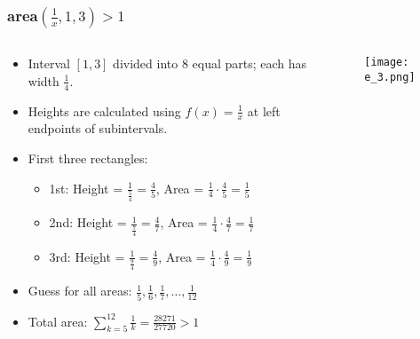 \begin{frame}
  \frametitle{area\((\frac{1}{x},1,3) > 1 \) }
  \begin{columns}
    \begin{column}{0.5\textwidth}
      \begin{itemize}
        \item Interval \([1, 3]\) divided into 8 equal parts; each has width \(\frac{1}{4}\).
        \item Heights are calculated using \(f(x) = \frac{1}{x}\) at left endpoints of subintervals.
        \item First three rectangles:
        \begin{itemize}
            \item 1st: Height = \(\frac{1}{\frac{5}{4}} = \frac{4}{5}\), Area = \(\frac{1}{4} \cdot \frac{4}{5} = \frac{1}{5}\)
            \item 2nd: Height = \(\frac{1}{\frac{7}{4}} = \frac{4}{7}\), Area = \(\frac{1}{4} \cdot \frac{4}{7} = \frac{1}{7}\)
            \item 3rd: Height = \(\frac{1}{\frac{9}{4}} = \frac{4}{9}\), Area = \(\frac{1}{4} \cdot \frac{4}{9} = \frac{1}{9}\)
        \end{itemize}
        \item Guess for all areas: \(\frac{1}{5}, \frac{1}{6}, \frac{1}{7}, \dots, \frac{1}{12}\)
        \item Total area: \(\sum_{k=5}^{12} \frac{1}{k} = \frac{28271}{27720} > 1\)
        
      \end{itemize}
    \end{column}
    \begin{column}{0.5\textwidth}
      \begin{figure}
        \texttt{[image: e\_3.png]}
      \end{figure}
    \end{column}
  \end{columns}
\end{frame}

